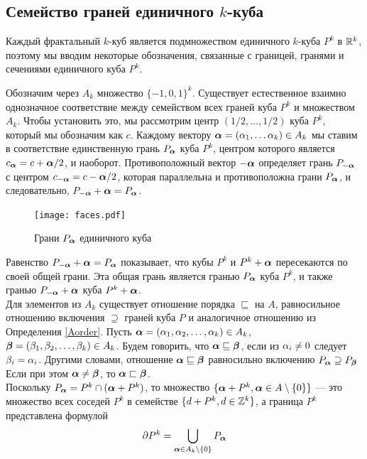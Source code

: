 \subsection{Семейство граней единичного $k$-куба} 

Каждый фрактальный $k$-куб является подмножеством единичного $k$-куба $P^k$ в $\mathbb{R}^k$, поэтому мы вводим некоторые обозначения, связанные с границей, гранями и сечениями единичного куба $P^k$.

Обозначим через $A_k$ множество $\{-1,0,1\}^k$. 
Существует естественное взаимно однозначное соответствие между семейством всех граней куба $P^k$ и множеством $A_k$.
Чтобы установить это, мы рассмотрим центр $(1/2,\ldots,1/2)$ куба $P^k$, который мы обозначим как $c$.
Каждому вектору ${\bm{\alpha}}=(\alpha_1,\ldots\alpha_k)\in A_k$ мы ставим в соответствие единственную грань $P_{\bm{\alpha}}$ куба $P^k$, центром которого является $c_{\bm{\alpha}}=c+{\bm{\alpha}}/2$, и наоборот. 
Противоположный вектор $-{\bm{\alpha}}$ определяет грань $P_{-{\bm{\alpha}}}$ с центром $c_{-{\bm{\alpha}}}=c-{\bm{\alpha}}/2$, которая параллельна и противоположна грани $P_{{\bm{\alpha}}}$, и следовательно, $P_{-{\bm{\alpha}}}+{\bm{\alpha}}=P_{\bm{\alpha}}$. 

 
\begin{figure}[H]
    \centering
    \texttt{[image: faces.pdf]}
    \caption{Грани $P_{\bm{\alpha}}$ единичного куба}
    \label{fig:uq_faces}
\end{figure}

Равенство $P_{-{\bm{\alpha}}}+{\bm{\alpha}}=P_{\bm{\alpha}}$ показывает, что кубы $P^k$ и $P^k+{\bm{\alpha}}$ пересекаются по своей общей грани. 
Эта общая грань является гранью $P_{\bm{\alpha}}$ куба $P^k$, и также гранью $P_{-{\bm{\alpha}}}+{\bm{\alpha}}$ куба $P^k +{\bm{\alpha}}$.\\

Для элементов из $A_k$ существует отношение порядка $\sqsubseteq$ на $A$, равносильное отношению включения $\supseteq$ граней куба $P$ и аналогичное отношению из Определения \ref{Aorder}.
Пусть ${\bm{\alpha}}=(\alpha_1,\alpha_2,\ldots,\alpha_k)\in A_k$, ${\bm{\beta}}=(\beta_1,\beta_2,\ldots,\beta_k)\in A_k$.
Будем говорить, что ${\bm{\alpha}}\sqsubseteq{\bm{\beta}}$, если из $\alpha_i\neq 0$ следует $\beta_i=\alpha_i$.
Другими словами, отношение ${\bm{\alpha}}\sqsubseteq{\bm{\beta}}$ равносильно включению $P_{\bm{\alpha}}\supseteq P_{\bm{\beta}}$
Если при этом ${\bm{\alpha}}\neq{\bm{\beta}}$, то ${\bm{\alpha}}\sqsubset{\bm{\beta}}$.\\

Поскольку $P_{\bm{\alpha}}=P^k\cap({\bm{\alpha}}+P^k)$, то множество
$\{{\bm{\alpha}}+P^k, {\bm{\alpha}}\in A\setminus \{0\}\}$ --- это множество всех соседей $P ^ k$ в семействе $\{d+P^k, d\in\mathbb{Z}^k\}$, а граница $P^k$ представлена формулой 
\begin{equation}\label{dpk}
\partial P^k=\bigcup\limits_{{\bm{\alpha}}\in A_k\setminus \{0\}}P_{\bm{\alpha}}
\end{equation}

